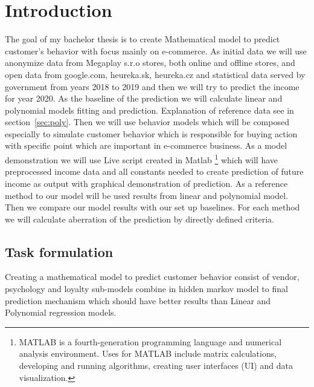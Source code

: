 
{}

\chapter*{Introduction}
The goal of my bachelor thesis is to create Mathematical model to predict customer’s behavior with focus mainly on e-commerce.
As initial data we will use anonymize data from Megaplay s.r.o stores, both online and offline stores, and open data from google.com,
heureka.sk, heureka.cz and statistical data served by government from years 2018 to 2019 and then we will try to predict the income for year 2020.
As the baseline of the prediction we will calculate linear and polynomial models fitting and prediction.
Explanation of reference data see in section~\ref{sec:poly}.
Then we will use behavior models which will be composed especially to simulate customer behavior which is responsible for
buying action with specific point which are important in e-commerce business.
As a model demonstration we will use  Live script created in Matlab \footnote{MATLAB is a fourth-generation programming
language and numerical analysis environment.
Uses for MATLAB include matrix calculations, developing and running algorithms, creating user interfaces (UI) and data visualization.}
which will have preprocessed income data and all constants needed to create prediction of future income as output with graphical demonstration of prediction.
As a reference method to our model will be used results from linear and polynomial model.
Then we compare our model results with our set up baselines.
For each method we will calculate aberration of the prediction by directly defined criteria.

\section*{Task formulation}

Creating a mathematical model to predict customer behavior consist of vendor, psychology and loyalty sub-models combine
in hidden markov model to final prediction mechanism which should have better results than Linear and Polynomial regression models.
